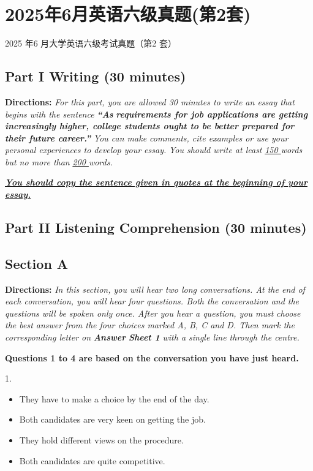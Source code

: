 \documentclass[UTF8,11pt]{ctexart}
\begin{document}
\section*{2025年6月英语六级真题(第2套)}
2025 年6 月大学英语六级考试真题（第2 套）


\subsection*{\textbf{Part I Writing} \textbf{(30 minutes)}}


\textbf{Directions:}\textit{ For this part, you are allowed 30 minutes to write an essay that begins with the sentence }\textbf{\textit{“As}} \textbf{\textit{requirements for job applications are getting increasingly higher, college students ought to be better prepared for}} \textbf{\textit{their future career.”}}\textit{ You can make comments, cite examples or use your personal experiences to develop your essay.} \textit{You should write at least }\textit{\uline{150 }}\textit{words but no more than }\textit{\uline{200 }}\textit{words.}


\textbf{\textit{\uline{You should copy the sentence given in quotes at the beginning of your essay.}}}


\subsection*{\textbf{Part II} \textbf{Listening Comprehension} \textbf{(30 minutes)}}


\subsection*{\textbf{Section A}}


\textbf{Directions:} \textit{In this section, you will hear two long conversations. At the end of each conversation, you will hear four} \textit{questions. Both the conversation and the questions will be spoken only once. After you hear a question, you must} \textit{choose the best answer from the four choices marked A, B, C and D. Then mark the corresponding letter on }\textbf{\textit{Answer}} \textbf{\textit{Sheet 1}}\textit{ with a single line through the centre.}


\textbf{Questions 1 to 4 are based on the conversation you have just heard.}


1.


\begin{itemize}[leftmargin=2em,itemsep=.2em,topsep=.4em]\item[A.] They have to make a choice by the end of the day.
\item[B.] Both candidates are very keen on getting the job.
\item[C.] They hold different views on the procedure.
\item[D.] Both candidates are quite competitive.
\end{itemize}
\end{document}
